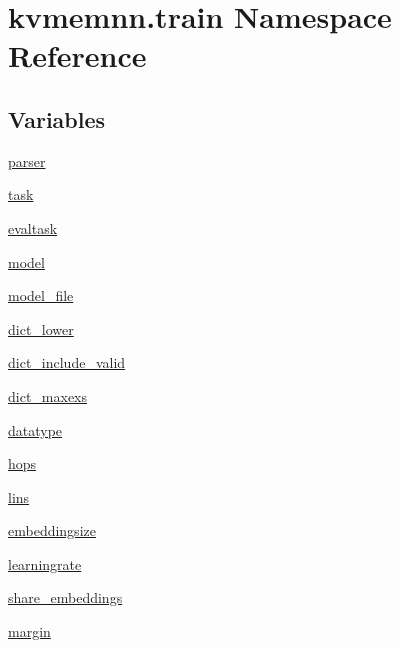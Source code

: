 \hypertarget{namespacekvmemnn_1_1train}{}\section{kvmemnn.\+train Namespace Reference}
\label{namespacekvmemnn_1_1train}
\subsection*{Variables}
\begin{DoxyCompactItemize}
\item 
\hyperlink{namespacekvmemnn_1_1train_ae5f5c954c5bd240b7abaf43df88b8249}{parser}
\item 
\hyperlink{namespacekvmemnn_1_1train_a9aa7602bdf67a65bc87807263f7a2a5b}{task}
\item 
\hyperlink{namespacekvmemnn_1_1train_aca4c1b288905ff0aa850533a4c6f8b30}{evaltask}
\item 
\hyperlink{namespacekvmemnn_1_1train_a8af5e391feea32cee7a2b3d4e0e0d974}{model}
\item 
\hyperlink{namespacekvmemnn_1_1train_add5d9815156b41fa669489a582e0324d}{model\+\_\+file}
\item 
\hyperlink{namespacekvmemnn_1_1train_a788ed861b4c76040d0bcebca1e930b4b}{dict\+\_\+lower}
\item 
\hyperlink{namespacekvmemnn_1_1train_ab09dbdf5a90c6dd383946655b1a73558}{dict\+\_\+include\+\_\+valid}
\item 
\hyperlink{namespacekvmemnn_1_1train_a4ad01b9cc129b2bd739131d3f5150ceb}{dict\+\_\+maxexs}
\item 
\hyperlink{namespacekvmemnn_1_1train_a11027f4fb15005cd3f2470d81d7d093f}{datatype}
\item 
\hyperlink{namespacekvmemnn_1_1train_aff8e5ed3817bd03e567690ad220b580e}{hops}
\item 
\hyperlink{namespacekvmemnn_1_1train_ab0b01491ca30e576f6d9afb03c485903}{lins}
\item 
\hyperlink{namespacekvmemnn_1_1train_a4b5efbafba71b68daa50952c63e6539f}{embeddingsize}
\item 
\hyperlink{namespacekvmemnn_1_1train_a1000b74d78e4eed487c5640178d37613}{learningrate}
\item 
\hyperlink{namespacekvmemnn_1_1train_a70287f0e3ae71f95ee862ba2ee327f80}{share\+\_\+embeddings}
\item 
\hyperlink{namespacekvmemnn_1_1train_a60d96964fea38e9def380fd0edc927f2}{margin}
\item 

\end{DoxyCompactItemize}
